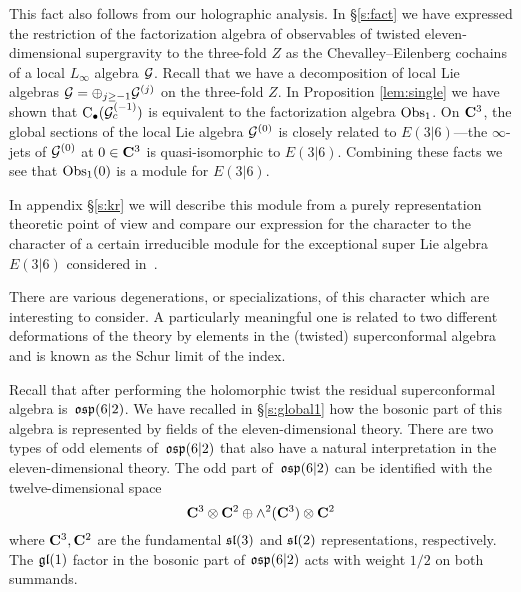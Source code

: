 This fact also follows from our holographic analysis. 
In \S \ref{s:fact} we have expressed the restriction of the factorization algebra of observables of twisted eleven-dimensional supergravity to the three-fold $Z$ as the Chevalley--Eilenberg cochains of a local $L_\infty$ algebra $\mathcal G$. 
Recall that we have a decomposition of local Lie algebras $\mathcal G = \oplus_{j \geq -1} \mathcal G^{(j)}$ on the three-fold $Z$. 
In Proposition \ref{lem:single} we have shown that ${\rm C}_\bullet (\mathcal G_{c}^{(-1)})$ is equivalent to the factorization algebra $\operatorname{Obs}_{1}$.
On $\mathbf{C}^3$, the global sections of the local Lie algebra $\mathcal G^{(0)}$ is closely related to $E(3|6)$---the $\infty$-jets of $\mathcal G^{(0)}$ at $0 \in \mathbf{C}^3$ is quasi-isomorphic to $E(3|6)$.
Combining these facts we see that $\operatorname{Obs}_{1}(0)$ is a module for $E(3|6)$. 

In appendix \S \ref{s:kr} we will describe this module from a purely representation theoretic point of view and compare our expression for the character to the character of a certain irreducible module for the exceptional super Lie algebra $E(3|6)$ considered in~\cite{KR2}.

%
%

\parsec
There are various degenerations, or specializations, of this character which are interesting to consider.
A particularly meaningful one is related to two different deformations of the theory by elements in the (twisted) superconformal algebra and is known as the Schur limit of the index.

Recall that after performing the holomorphic twist the residual superconformal algebra is~$\mathfrak{osp}(6|2)$.
We have recalled in \S\ref{s:global1} how the bosonic part of this algebra is represented by fields of the eleven-dimensional theory. 
There are two types of odd elements of~$\mathfrak{osp}(6|2)$ that also have a natural interpretation in the eleven-dimensional theory.
The odd part of~$\mathfrak{osp}(6|2)$ can be identified with the twelve-dimensional space
\[
\mathbf{C}^3 \otimes \mathbf{C}^2 \oplus \wedge^2(\mathbf{C}^3) \otimes \mathbf{C}^2 
\]
where $\mathbf{C}^3, \mathbf{C}^2$ are the fundamental $\mathfrak{sl}(3)$ and $\mathfrak{sl}(2)$ representations, respectively. 
The $\mathfrak{gl}(1)$ factor in the bosonic part of $\mathfrak{osp}(6|2)$ acts with weight $1/2$ on both summands. 


